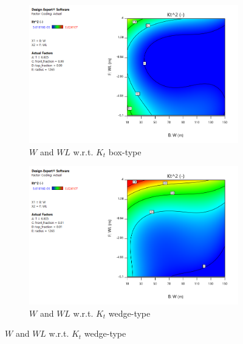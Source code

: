 \begin{figure}[h]
\begin{subfigure}[b]{0.49\textwidth}
        \centering 
        \includegraphics[width=\textwidth]{figures/ComFLOW/Results DI1/Kt_W_WL_box_png.png}
        \caption[]%
        {{\small $W$ and $WL$ w.r.t. $K_{t}$ box-type}}    
        \label{fig: Kt_W_WL_box DI1 H3 captive}
    \end{subfigure}
    \hfill
    \begin{subfigure}[b]{0.49\textwidth}   
        \centering 
        \includegraphics[width=\textwidth]{figures/ComFLOW/Results DI1/Kt_W_WL_wedge_png.png}
        \caption[]%
        {{\small $W$ and $WL$ w.r.t. $K_{t}$ wedge-type}}    
        \label{fig: Kt_W_WL_wedge DI1 H3 captive}
    \end{subfigure}
    

\end{figure}
